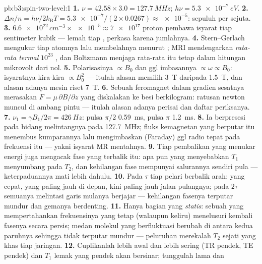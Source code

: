 \begin{solution}{pb:b3:spin-two-level:1}
\textbf{1.} $\nu = 42.58 \times 3.0 = \qty{127.7}{MHz}$; $h\nu =
\qty{5.3e-7}{eV}$.
\textbf{2.} $\Delta n/n = h\nu/2k_{\text{B}}T = \num{5.3e-7}/(2
\times 0.0267) \approx \num{e-5}$: sepuluh per sejuta.
\textbf{3.} $\num{6.6e22}\,\unit{cm^{-3}} \times \num{e-5} \approx
\num{7e17}$ proton pembawa isyarat tiap sentimeter kubik --- lemah
tiap , perkasa karena jumlahnya.
\textbf{4.} Stern--Gerlach mengukur tiap atomnya lalu membelahnya
menurut ; MRI mendengarkan \emph{rata-rata termal}
$10^{23}$ , dan Boltzmann menjaga rata-rata itu tetap dalam
hitungan mikrovolt dari nol.
\textbf{5.} Polarisasinya $\propto B_0$ dan ggl imbasannya
$\propto \omega \propto B_0$: isyaratnya kira-kira $\propto B_0^2$ ---
itulah alasan memilih \qty{3}{T} daripada \qty{1.5}{T}, dan alasan
adanya mesin riset \qty{7}{T}.
\textbf{6.} Sebuah feromagnet dalam gradien sesatnya merasakan
$F = \mu\,\partial B/\partial z$ yang diskalakan ke besi berkilogram:
ratusan newton muncul di ambang pintu --- itulah alasan adanya
perisai dan daftar periksanya.
\textbf{7.} $\nu_1 = \gamma B_1/2\pi = \qty{426}{Hz}$: pulsa $\pi/2$
\qty{0.59}{ms}, pulsa $\pi$ \qty{1.2}{ms}.
\textbf{8.} Ia berpresesi pada bidang melintangnya pada
\qty{127.7}{MHz}; fluks kemagnetan yang berputar itu menembus
kumparannya lalu mengimbaskan (Faraday) ggl radio tepat pada frekuensi
itu --- yakni isyarat MR mentahnya.
\textbf{9.} Tiap pembalikan yang menukar energi juga mengacak fase 
yang terbalik itu: apa pun yang menyebabkan $T_1$ menyumbang pada $T_2$,
dan kehilangan fase mempunyai salurannya sendiri pula --- keterpaduannya
mati lebih dahulu.
\textbf{10.} Pada $\tau$ tiap pelari berbalik arah: yang cepat, yang
paling jauh di depan, kini paling jauh jalan pulangnya; pada $2\tau$
semuanya melintasi garis mulanya berjajar --- kehilangan fasenya
terputar mundur dan gemanya berdenting.
\textbf{11.} Hanya bagian yang \emph{statis}: sebuah  yang
mempertahankan frekuensinya yang tetap (walaupun keliru) menelusuri
kembali fasenya secara persis; medan molekul yang berfluktuasi berubah
di antara kedua paruhnya sehingga tidak terputar mundur --- peluruhan
merekalah $T_2$ sejati yang khas tiap jaringan.
\textbf{12.} Cuplikanlah lebih awal dan lebih sering (TR pendek, TE
pendek) dan $T_1$ lemak yang pendek akan bersinar; tunggulah lama dan

\end{solution}
